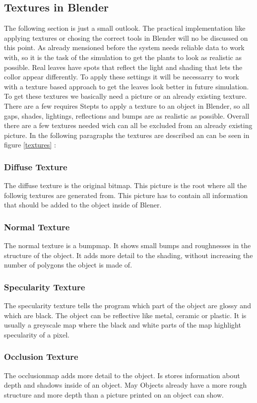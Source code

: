 \subsection{Textures in Blender}

The following section is just a small outlook. The practical implementation like applying textures or chosing the correct tools in Blender will no be discussed on this point.\newline
As already mensioned before the system needs reliable data to work with, so it is the task of the simulation to get the plants to look as realistic as possible. Real leaves have spots that reflect the light and shading that lets the collor appear differently. To apply these settings it will be necessarry to work with a texture based approach to get the leaves look better in future simulation. 
To get these textures we basically need a picture or an already existing texture. There are a few requires Stepts to apply a texture to an object in Blender, so all gaps, shades, lightings, reflections and bumps are as realistic as possible.
Overall there are a few textures needed wich can all be excluded from an already existing picture.
In the following paragraphs the textures are described an can be seen in figure \ref{textures} :
\subsubsection{Diffuse Texture}
The diffuse texture is the original bitmap. This picture is the root where all the followig textures are generated from. This picture has to contain all information that should be added to the object inside of Blener.
\subsubsection{Normal Texture}
The normal texture is a bumpmap. It shows small bumps and roughnesses in the structure of the object. It adds more detail to the shading, without increasing the number of polygons the object is made of. 
\subsubsection{Specularity Texture}
The specularity texture tells the program which part of the object are glossy and which are black. The object can be reflective like metal, ceramic or plastic. It is usually a greyscale map where the black and white parts of the map highlight specularity of a pixel.
\subsubsection{Occlusion Texture}
The occlusionmap adds more detail to the object. Is stores information about depth and shadows inside of an object. May Objects already have a more rough structure and more depth than a picture printed on an object can show.

